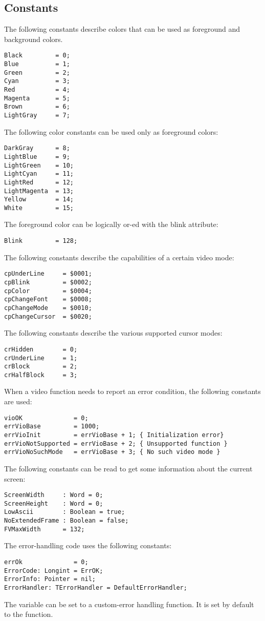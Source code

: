 \subsection{Constants}
The following constants describe colors that can be used as 
foreground and background colors.
\begin{verbatim}
Black         = 0;
Blue          = 1;
Green         = 2;
Cyan          = 3;
Red           = 4;
Magenta       = 5;
Brown         = 6;
LightGray     = 7;
\end{verbatim}
The following color constants can be used only as foreground colors:
\begin{verbatim}
DarkGray      = 8;
LightBlue     = 9;
LightGreen    = 10;
LightCyan     = 11;
LightRed      = 12;
LightMagenta  = 13;
Yellow        = 14;
White         = 15;
\end{verbatim}
The foreground color can be logically or-ed with the blink attribute:
\begin{verbatim}
Blink         = 128;
\end{verbatim}
The following constants describe the capabilities of a certain video mode:
\begin{verbatim}
cpUnderLine     = $0001;
cpBlink         = $0002;
cpColor         = $0004;
cpChangeFont    = $0008;
cpChangeMode    = $0010;
cpChangeCursor  = $0020;
\end{verbatim}
The following constants describe the various supported cursor modes:
\begin{verbatim}
crHidden        = 0;
crUnderLine     = 1;
crBlock         = 2;
crHalfBlock     = 3;
\end{verbatim}
When a video function needs to report an error condition, the following
constants are used:
\begin{verbatim}
vioOK              = 0;
errVioBase         = 1000;
errVioInit         = errVioBase + 1; { Initialization error}
errVioNotSupported = errVioBase + 2; { Unsupported function }
errVioNoSuchMode   = errVioBase + 3; { No such video mode }
\end{verbatim}
The following constants can be read to get some information about the
current screen:
\begin{verbatim}
ScreenWidth     : Word = 0;
ScreenHeight    : Word = 0;
LowAscii        : Boolean = true;
NoExtendedFrame : Boolean = false;
FVMaxWidth      = 132;
\end{verbatim}
The error-handling code uses the following constants:
\begin{verbatim}
errOk              = 0;
ErrorCode: Longint = ErrOK;
ErrorInfo: Pointer = nil;
ErrorHandler: TErrorHandler = DefaultErrorHandler;
\end{verbatim}
The  variable can be set to a custom-error handling
function. It is set by default to the  function.

